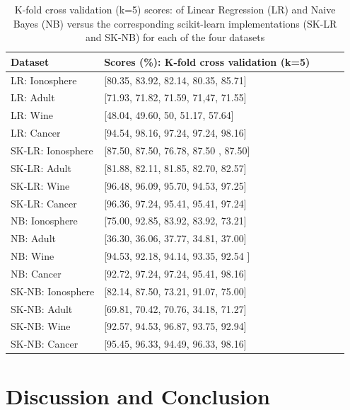 \documentclass[conference]{IEEEtran}
\begin{document}
\begin{table}
  \caption{K-fold cross validation (k=5) scores: of Linear Regression (LR) and Naive Bayes (NB) versus the corresponding scikit-learn implementations (SK-LR and SK-NB) for each of the four datasets}
  \label{table:cross}
  \centering
  \begin{tabular}{lllll}
    \toprule
    Dataset       & Scores (\%): K-fold cross validation (k=5) \\
    \midrule
    LR: Ionosphere    & [80.35, 83.92, 82.14, 80.35, 85.71]  \\
    LR: Adult         & [71.93, 71.82, 71.59, 71,47, 71.55]  \\
    LR: Wine & [48.04, 49.60, 50, 51.17, 57.64]  \\
    LR: Cancer & [94.54, 98.16, 97.24, 97.24, 98.16]  \\
    
    SK-LR: Ionosphere    & [87.50, 87.50, 76.78, 87.50 , 87.50]  \\
    SK-LR: Adult         & [81.88, 82.11, 81.85, 82.70, 82.57]  \\
    SK-LR: Wine  & [96.48, 96.09, 95.70, 94.53, 97.25]  \\
    SK-LR: Cancer & [96.36, 97.24, 95.41, 95.41, 97.24]  \\
    
    NB: Ionosphere    & [75.00, 92.85, 83.92, 83.92, 73.21]  \\
    NB: Adult         & [36.30, 36.06, 37.77, 34.81, 37.00]  \\
    NB: Wine  & [94.53, 92.18, 94.14, 93.35, 92.54 ]  \\
    NB: Cancer & [92.72, 97.24, 97.24, 95.41, 98.16] \\
    
    SK-NB: Ionosphere    & [82.14, 87.50, 73.21, 91.07, 75.00] \\
    SK-NB: Adult         & [69.81, 70.42, 70.76, 34.18, 71.27]  \\
    SK-NB: Wine & [92.57, 94.53, 96.87, 93.75, 92.94]  \\
    SK-NB: Cancer & [95.45, 96.33, 94.49, 96.33, 98.16]  \\
    \bottomrule
  \end{tabular}
\end{table}

\section{Discussion and Conclusion}
\label{section:discussion}
\end{document}
